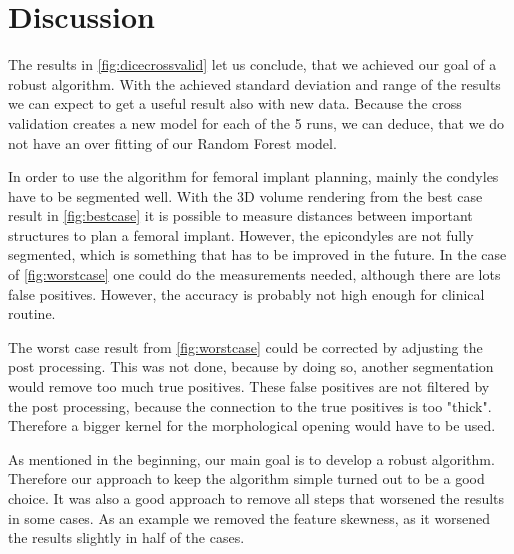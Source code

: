 \section{Discussion}
The results in \autoref{fig:dicecrossvalid} let us conclude, that we achieved our goal of a robust algorithm. %
With the achieved standard deviation and range of the results we can expect to get a useful result also with new data. Because the cross validation creates a new model for each of the 5 runs, we can deduce, that we do not have an over fitting of our Random Forest model.

In order to use the algorithm for femoral implant planning, mainly the condyles have to be segmented well. With the 3D volume rendering from the best case result in \autoref{fig:bestcase} it is possible to measure distances between important structures to plan a femoral implant. However, the epicondyles are not fully segmented, which is something that has to be improved in the future. In the case of \autoref{fig:worstcase} one could do the measurements needed, although there are lots false positives. However, the accuracy is probably not high enough for clinical routine.

The worst case result from \autoref{fig:worstcase} could be corrected by adjusting the post processing. This was not done, because by doing so, another segmentation would remove too much true positives. These false positives are not filtered by the post processing, because the connection to the true positives is too "thick". Therefore a bigger kernel for the morphological opening would have to be used.

As mentioned in the beginning, our main goal is to develop a robust algorithm. Therefore our approach to keep the algorithm simple turned out to be a good choice. It was also a good approach to remove all steps that worsened the results in some cases. As an example we removed the feature skewness, as it worsened the results slightly in half of the cases.